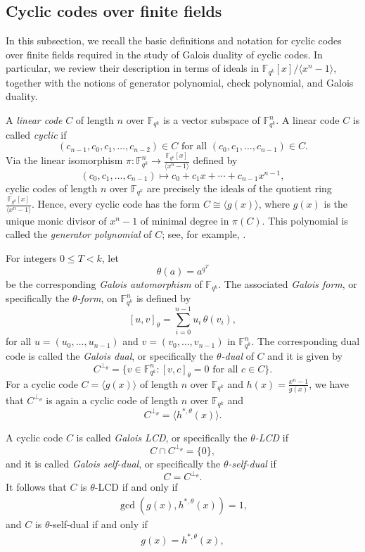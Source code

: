 \documentclass[pdflatex,sn-mathphys-num]{sn-jnl}%
\theoremstyle{thmstyleone}%
\theoremstyle{thmstyletwo}%
\theoremstyle{thmstylethree}%
\newcommand{\F}{\mathbb{F}}
\begin{document}
\subsection{Cyclic codes over finite fields}

In this subsection, we recall the basic definitions and notation for cyclic codes over finite fields required in the study of Galois duality of cyclic codes. In particular, we review their description in terms of ideals in $\F_{q^k}[x]/\langle x^n-1\rangle$, together with the notions of generator polynomial, check polynomial, and Galois duality.

A \emph{linear code}  $C$ of length $n$ over $\F_{q^k}$ is a vector subspace
of $ \F_{q^k}^n$.
A linear code $C$ is called \emph{cyclic} if
\[ (c_{n-1},c_0,c_1,\dots,c_{n-2})\in C \text{ for all }
(c_0,c_1,\dots,c_{n-1})\in C.
\]
 Via the linear isomorphism
$
\pi:\F_{q^k}^n \rightarrow \frac{\F_{q^k}[x]}{\langle x^n-1\rangle}
$
defined by
\[
(c_0,c_1,\dots,c_{n-1}) \mapsto c_0+c_1x+\cdots+c_{n-1}x^{n-1},
\]
cyclic codes of length $n$ over $\F_{q^k}$  are precisely the ideals of the quotient ring
$
\frac{\F_{q^k}[x]}{\langle x^n-1\rangle}$.
Hence, every cyclic code has the form $
C\cong\langle g(x)\rangle$,
where $g(x)$ is the unique monic divisor of $x^n-1$ of minimal degree in $\pi(C)$. This polynomial is called the \emph{generator polynomial} of $C$; see, for example, \cite{JLX2011}.

For integers $0\le T<k$, let
\[
\theta(a)=a^{q^T} 
\]
be the corresponding {\em Galois automorphism} of $\F_{q^k}$. The associated \emph{Galois form}, or specifically the \emph{$\theta$-form}, on $\F_{q^k}^n$ is defined by
\[
[u,v]_{\theta}=\sum_{i=0}^{n-1}u_i\,\theta(v_i),
\]
for all 
$u=(u_0,\dots,u_{n-1})$ and $ v=(v_0,\dots,v_{n-1})$ in $ \F_{q^k}^n$.
The corresponding dual code is called the \emph{Galois dual}, or specifically the \emph{$\theta$-dual} of $C$ and it is given  by
\[
C^{\perp_\theta} =\{ v\in \F_{q^k}^n: [v,c]_{\theta} =0 \text{ for all } c\in C\}.
\]
For a cyclic code $C=\langle g(x)\rangle$ of length $n$ over $\F_{q^k}$ and 
$
h(x)=\frac{x^n-1}{g(x)}
$, we have  that  $C^{\perp_\theta}$  is again  a cyclic code  of length $n$ over $\F_{q^k}$ and 
\[ 
C^{\perp_\theta}=\langle h^{\ast,\theta}(x)\rangle.
\]

A cyclic code $C$ is called \emph{Galois LCD}, or specifically the \emph{$\theta$-LCD}  if
\[
C\cap C^{\perp_\theta}=\{0\},
\]
and it is called \emph{Galois self-dual}, or specifically the \emph{$\theta$-self-dual} if
\[
C=C^{\perp_\theta}.
\]
It follows that $C$ is  $\theta$-LCD  if and only if 
\begin{align}
  \gcd(g(x),  h^{\ast,\theta}(x) )=1\label{eq-LCD},
\end{align}
and $C$ is  $\theta$-self-dual if and only if 
\begin{align}
  g(x)=  h^{\ast,\theta}(x) \label{eq-SD},
\end{align}
\end{document}
